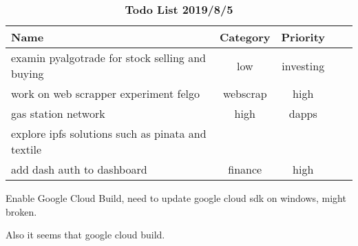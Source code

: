 \begin{table}
\begin{tabular}{p{3cm} c c c c}Name & Category & Priority \\ \hline  examin pyalgotrade for stock selling and buying &  low &  investing \\ \hline  work on web scrapper experiment felgo &  webscrap &  high \\ \hline  gas station network  &  high &  dapps \\ \hline  explore ipfs solutions such as pinata and textile &   &  \\ \hline  add dash auth to dashboard &  finance &  high \\ \hline
\end{tabular}
\caption{\textbf{Todo List 2019/8/5}}
\end{table}

Enable Google Cloud Build, need to update google cloud sdk on windows, might broken.

Also it seems that google cloud build.
